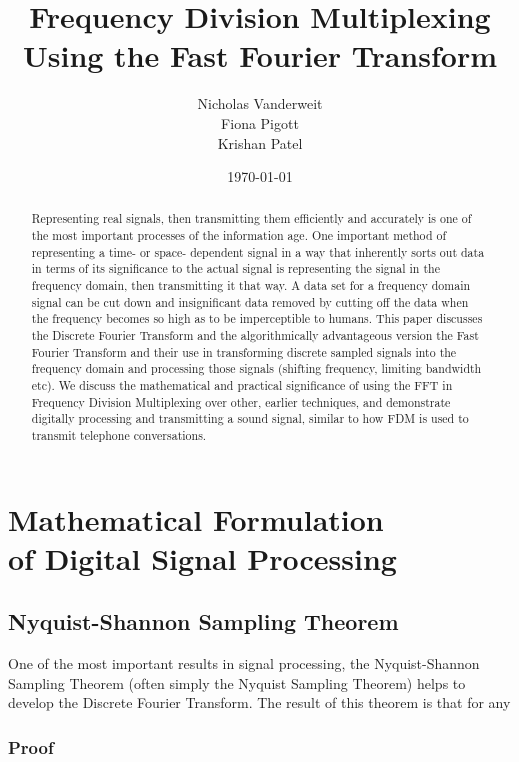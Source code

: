 \documentclass[12pt]{article}
\title{Frequency Division Multiplexing \\Using the Fast Fourier Transform }
\author{Nicholas Vanderweit \\Fiona Pigott \\Krishan Patel} \date{\today}
\begin{document}
 \maketitle


\begin{abstract}

Representing real signals, then transmitting them efficiently and accurately is
one of the most important processes of the information age. One important
method of representing a time- or space- dependent signal in a way that
inherently sorts out data in terms of its significance to the actual signal is
representing the signal in the frequency domain, then transmitting it that way.
A data set for a frequency domain signal can be cut down and insignificant data
removed by cutting off the data when the frequency becomes so high as to be
imperceptible to humans.  This paper discusses the Discrete Fourier Transform
and the algorithmically advantageous version the Fast Fourier Transform and
their use in transforming discrete sampled signals into the frequency domain
and processing those signals (shifting frequency, limiting bandwidth etc). We
discuss the mathematical and practical significance of using the FFT in
Frequency Division Multiplexing over other, earlier techniques, and demonstrate
digitally processing and transmitting a sound signal, similar to how FDM is
used to transmit telephone conversations.

\end{abstract}

\clearpage

\section{Mathematical Formulation \\of Digital Signal Processing}

\subsection{Nyquist-Shannon Sampling Theorem}

One of the most important results in signal processing, the Nyquist-Shannon
Sampling Theorem (often simply the Nyquist Sampling Theorem) helps to develop
the Discrete Fourier Transform. The result of this theorem is that for any 

\subsubsection{Proof}
\end{document}
